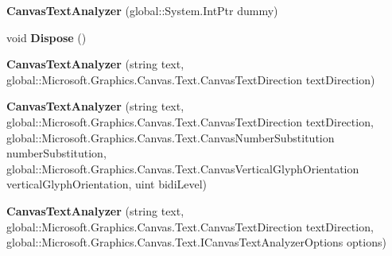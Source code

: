\begin{DoxyCompactItemize}
\item 
\mbox{\label{class_microsoft_1_1_graphics_1_1_canvas_1_1_text_1_1_canvas_text_analyzer_ac8173f39f6bd783b212836c473af2e2d}} 
{\bfseries Canvas\+Text\+Analyzer} (global\+::\+System.\+Int\+Ptr dummy)
\item 
\mbox{\label{class_microsoft_1_1_graphics_1_1_canvas_1_1_text_1_1_canvas_text_analyzer_a29ec6d38a21ef39bf02be6c27ca74fe9}} 
void {\bfseries Dispose} ()
\item 
\mbox{\label{class_microsoft_1_1_graphics_1_1_canvas_1_1_text_1_1_canvas_text_analyzer_a9b82d9ebaf24510683045414b6ffb1a9}} 
{\bfseries Canvas\+Text\+Analyzer} (string text, global\+::\+Microsoft.\+Graphics.\+Canvas.\+Text.\+Canvas\+Text\+Direction text\+Direction)
\item 
\mbox{\label{class_microsoft_1_1_graphics_1_1_canvas_1_1_text_1_1_canvas_text_analyzer_aea0f6d0276cc0876f6d564ad7663e994}} 
{\bfseries Canvas\+Text\+Analyzer} (string text, global\+::\+Microsoft.\+Graphics.\+Canvas.\+Text.\+Canvas\+Text\+Direction text\+Direction, global\+::\+Microsoft.\+Graphics.\+Canvas.\+Text.\+Canvas\+Number\+Substitution number\+Substitution, global\+::\+Microsoft.\+Graphics.\+Canvas.\+Text.\+Canvas\+Vertical\+Glyph\+Orientation vertical\+Glyph\+Orientation, uint bidi\+Level)
\item 
\mbox{\label{class_microsoft_1_1_graphics_1_1_canvas_1_1_text_1_1_canvas_text_analyzer_a172420a2c7819041ea02464efb76d339}} 
{\bfseries Canvas\+Text\+Analyzer} (string text, global\+::\+Microsoft.\+Graphics.\+Canvas.\+Text.\+Canvas\+Text\+Direction text\+Direction, global\+::\+Microsoft.\+Graphics.\+Canvas.\+Text.\+I\+Canvas\+Text\+Analyzer\+Options options)
\item 
\mbox{\label{class_microsoft_1_1_graphics_1_1_canvas_1_1_text_1_1_canvas_text_analyzer_ac1c293067524638962722883284c69ca}} 

\end{DoxyCompactItemize}
